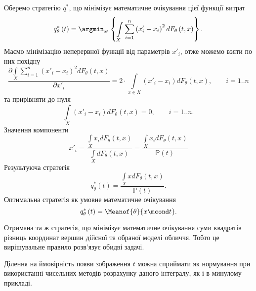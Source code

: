 Оберемо стратегію $q^*$,
що мінімізує математичне очікування цієї функції витрат
\begin{equation*}
  q^*_{\theta}\left( t \right)
  = \argmin_{x'} \left\{
    \int\limits_{X}
        \sum_{i = 1}^n \left( x'_i - x_i \right)^2
        dF_{\theta}\left( t, x \right)
    \right\}.
\end{equation*}
Маємо мінімізацію неперервної функції від параметрів $x'_i$,
отже можемо взяти по них похідну
\begin{equation*}
  \frac{\partial \int\limits_{X}
      \sum\limits_{i = 1}^n \left( x'_i - x_i \right)^2
      dF_{\theta}\left( t, x \right)
  }{\partial x'_i}
  = 2 \cdot \int\limits_{x \in X} \left( x'_i - x_i \right)
    dF_{\theta}\left( t, x \right), \qquad i = 1..n
\end{equation*}
та прирівняти до нуля
\begin{equation*}
  \int\limits_{X}
    \left( x'_i - x_i \right) dF_{\theta}\left( t, x \right) = 0, \qquad i = 1..n.
\end{equation*}
Значення компоненти
\begin{equation*}
  x'_i
  = \frac{\int\limits_{X} x_i dF_{\theta}\left( t, x \right)}
         {\int\limits_{X} dF_{\theta}\left( t, x \right)}
  = \frac{\int\limits_{X} x_i dF_{\theta}\left( t, x \right)}
         {\mathbb{P}\left( t \right)}
\end{equation*}
Результуюча стратегія
\begin{equation*}
  q^*_{\theta}\left( t \right)
  = \frac{\int\limits_{X} x dF_{\theta}\left( t, x \right)}{\mathbb{P}\left( t \right)}.
\end{equation*}
Оптимальна стратегія як умовне математичне очікування
\begin{equation*}
  q^*_{\theta}\left( t \right) = \Meanof{\theta}{x \mcond t}.
\end{equation*}

Отримана та ж стратегія,
що мінімізує математичне очікування суми квадратів різниць
координат вершин дійсної та обраної моделі обличчя.
Тобто це вирішувальне правило розв'язує обидві задачі.

Ділення на ймовірність появи зображення $t$ можна сприймати як нормування
при використанні чисельних методів розрахунку даного інтегралу,
як і в минулому прикладі.
